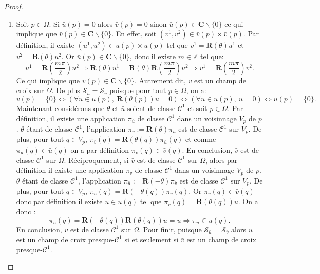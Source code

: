 \begin{proof}
\begin{enumerate}
\item Soit $p\in\Omega$. Si $\bar{u}(p)=0$ alors $\bar{v}(p)=0$ sinon $\bar{u}(p)\in\mathbf{C}\backslash\{0\}$ ce qui implique que $\bar{v}(p)\in\mathbf{C}\backslash\{0\}$. En effet, soit $(v^1, v^2)\in\bar{v}(p)\times\bar{v}(p)$. Par définition, il existe $(u^1, u^2)\in\bar{u}(p)\times\bar{u}(p)$ tel que $v^1=\mathbf{R}(\theta)u^1$ et $v^2=\mathbf{R}(\theta)u^2$. Or $\bar{u}(p)\in\mathbf{C}\backslash\{0\}$, donc il existe $m\in\mathbb{Z}$ tel que:
$$
u^1=\mathbf{R}\left(\frac{m\pi}{2}\right)u^2\Longrightarrow
\mathbf{R}(\theta)u^1=\mathbf{R}(\theta)\mathbf{R}\left(\frac{m\pi}{2}\right)u^2\Longrightarrow
v^1=\mathbf{R}\left(\frac{m\pi}{2}\right)v^2.
$$
Ce qui implique que $\bar{v}(p)\in\mathbf{C}\backslash\{0\}$. Autrement dit, $\bar{v}$ est un champ de croix sur $\Omega$. De plus $\mathcal{S}_{\bar{u}}=\mathcal{S}_{\bar{v}}$ puisque pour tout $p\in\Omega$, on a:
$$\bar{v}(p)=\{0\} \Leftrightarrow \left(\forall u\in \bar{u}(p),~\mathbf{R}(\theta(p)) u=0\right)\Leftrightarrow \left(\forall u\in \bar{u}(p),~u=0\right) \Leftrightarrow \bar{u}(p)=\{0\}.$$
Maintenant considérons que $\theta$  et $\bar{u}$ soient de classe $\mathcal{C}^1$ et soit $p\in\Omega$. Par définition, il existe une application $\pi_{\bar{u}}$ de classe $\mathcal{C}^1$ dans un voisinnage $V_p$ de $p$. $\theta$ étant de classe $\mathcal{C}^1$, l'application $\pi_{\bar{v}}:=\mathbf{R}(\theta)\pi_{\bar{u}}$ est de classe $\mathcal{C}^1$ sur $V_p$. De plus, pour tout $q\in V_p$, $\pi_{\bar{v}}(q)=\mathbf{R}(\theta(q))\pi_{\bar{u}}(q)$ et comme $\pi_{\bar{u}}(q)\in\bar{u}(q)$ on a par définition $\pi_{\bar{v}}(q)\in\bar{v}(q)$. En conclusion, $\bar{v}$ est de classe $\mathcal{C}^1$ sur $\Omega$. Réciproquement, si $\bar{v}$ est de classe $\mathcal{C}^1$ sur $\Omega$, alors par définition il existe une application $\pi_{\bar{v}}$ de classe $\mathcal{C}^1$ dans un voisinnage $V_p$ de $p$. $\theta$ étant de classe $\mathcal{C}^1$, l'application $\pi_{\bar{u}}:=\mathbf{R}(-\theta)\pi_{\bar{v}}$ est de classe $\mathcal{C}^1$ sur $V_p$. De plus, pour tout $q\in V_p$, $\pi_{\bar{u}}(q)=\mathbf{R}(-\theta(q))\pi_{\bar{v}}(q)$. Or $\pi_{\bar{v}}(q)\in\bar{v}(q)$ donc par définition il existe $u\in\bar{u}(q)$ tel que $\pi_{\bar{v}}(q)=\mathbf{R}(\theta(q))u$. On a donc :
$$
\pi_{\bar{u}}(q)=\mathbf{R}(-\theta(q))\mathbf{R}(\theta(q))u=u\Longrightarrow\pi_{\bar{u}}\in\bar{u}(q).
$$
En conclusion, $\bar{v}$ est de classe $\mathcal{C}^1$ sur $\Omega$. Pour finir, puisque $\mathcal{S}_{\bar{u}}=\mathcal{S}_{\bar{v}}$ alors $\bar{u}$ est un champ de croix presque-$\mathcal{C}^1$ si et seulement si $\bar{v}$ est un champ de croix presque-$\mathcal{C}^1$.
\end{enumerate}
\end{proof}

